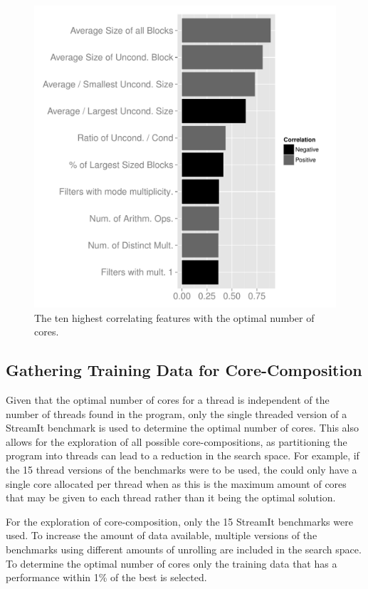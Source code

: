
\begin{figure}[t]
  \includegraphics[width=1\textwidth]{streamit-paper/graphics/coreCorr.pdf}
  \caption{The ten highest correlating features with the optimal number of cores.}\label{fig:corrCore}
\end{figure}


\subsection{Gathering Training Data for Core-Composition}
Given that the optimal number of cores for a thread is independent of the number of threads found in the program, only the single threaded version of a StreamIt benchmark is used to determine the optimal number of cores.
This also allows for the exploration of all possible core-compositions, as partitioning the program into threads can lead to a reduction in the search space.
For example, if the 15 thread versions of the benchmarks were to be used, the could only have a single core allocated per thread when as this is the maximum amount of cores that may be given to each thread rather than it being the optimal solution.

For the exploration of core-composition, only the 15 StreamIt benchmarks were used.
To increase the amount of data available, multiple versions of the benchmarks using different amounts of unrolling are included in the search space.
To determine the optimal number of cores only the training data that has a performance within 1\% of the best is selected.

